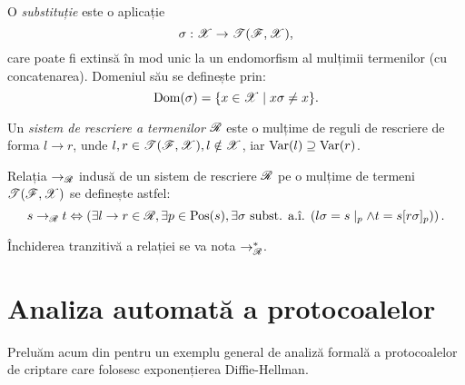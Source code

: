 O \emph{substituție} este o aplicație 
\[
    \sigma : \mathscr{X} \to \mathscr{T}(\mathscr{F}, \mathscr{X}),
\]
care poate fi extinsă în mod unic la un endomorfism al mulțimii
termenilor (cu concatenarea). Domeniul său se definește prin:
\[
    \mathrm{Dom}(\sigma) = \{ x \in \mathscr{X} \mid x\sigma \neq x \}.
\]

Un \emph{sistem de rescriere a termenilor} $ \mathscr{R} $ este o mulțime
de reguli de rescriere de forma $ l \to r $, unde
$ l, r \in \mathscr{T}(\mathscr{F}, \mathscr{X}), l \notin \mathscr{X} $, iar
$ \mathrm{Var}(l) \supseteq \mathrm{Var}(r) $.

Relația $ \to_\mathscr{R} $ indusă de un sistem de rescriere $ \mathscr{R} $
pe o mulțime de termeni $ \mathscr{T}(\mathscr{F}, \mathscr{X}) $ se definește
astfel:
\[
    s \to_\kal{R} t \Leftrightarrow \left( \exists l \to r \in \kal{R}, %
        \exists p \in \dr{Pos}(s), \exists \sigma \text{ subst. a.î. } %
    (l\sigma = s\mid_p \land t = s [r\sigma]_p) \right).
\]

Închiderea tranzitivă a relației se va nota $ \to^\ast_\mathscr{R} $.


\section{Analiza automată a protocoalelor}

Preluăm acum din \cite[Cap.\ 3]{schmidt} pentru un exemplu general de
analiză formală a protocoalelor de criptare care folosesc exponențierea
Diffie-Hellman.
